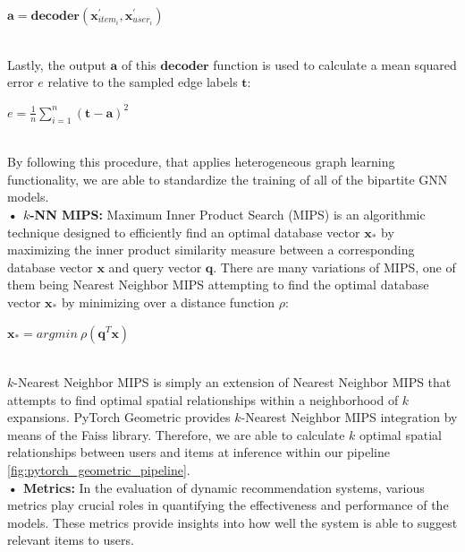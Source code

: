 \documentclass[bst/sn-nature]{sn-jnl}
\begin{document}
\begin{multicols}{2}
\begin{center}
    $\mathbf{a} = \textbf{decoder}(\mathbf{x}^{\prime}_{item_{i}},\mathbf{x}^{\prime}_{user_{i}})$ \\~\\
\end{center} 

Lastly, the output $\mathbf{a}$ of this $\textbf{decoder}$ function is used to calculate a mean squared error $e$ relative to the sampled edge labels $\mathbf{t}$:

\begin{center}
    $e = \frac{1}{n} \sum_{i=1}^{n} (\mathbf{t} - \mathbf{a})^2$\\~\\
\end{center}

By following this procedure, that applies heterogeneous graph learning functionality, we are able to standardize the training of all of the bipartite GNN models. \\ 

\textbf{• $k$-NN MIPS:} Maximum Inner Product Search (MIPS) is an algorithmic technique designed to efficiently find an optimal database vector $\mathbf{x_{*}}$ by maximizing the inner product similarity measure between a corresponding database vector $\mathbf{x}$ and query vector $\mathbf{q}$. There are many variations of MIPS, one of them being Nearest Neighbor MIPS\cite{nnmips1, nnmips2} attempting to find the optimal database vector $\mathbf{x_{*}}$ by minimizing over a distance function $\rho$: \\ 

\begin{center}
    $\mathbf{x_{*}} = argmin \ \rho(\mathbf{q}^T \mathbf{x})$\\~\\
\end{center}

$k$-Nearest Neighbor MIPS\cite{nnmips3} is simply an extension of Nearest Neighbor MIPS that attempts to find optimal spatial relationships within a neighborhood of $k$ expansions.
PyTorch Geometric provides $k$-Nearest Neighbor MIPS\cite{nnmips3} integration by means of the Faiss library\cite{faiss}. Therefore, we are able to calculate $k$ optimal spatial relationships between users and items at inference within our pipeline \ref{fig:pytorch_geometric_pipeline}. \\ 

\textbf{• Metrics:} In the evaluation of dynamic recommendation systems, various metrics play crucial roles in quantifying the effectiveness and performance of the models. These metrics provide insights into how well the system is able to suggest relevant items to users. 


\end{multicols}
\end{document}
